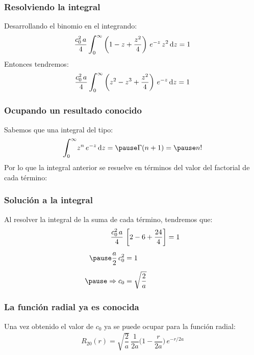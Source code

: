 \documentclass[12pt]{beamer}
\begin{document}
\begin{frame}
\frametitle{Resolviendo la integral}
Desarrollando el binomio en el integrando:
\pause
\begin{align*}
\dfrac{c_{0}^{2} \, a}{4} \, \scaleint{6ex}_{\bs 0}^{\infty} \left( 1 - z + \dfrac{z^{2}}{4} \right) \, e^{-z} \, z^{2} \dd{z} = 1
\end{align*}
\pause
Entonces tendremos:
\begin{align*}
\dfrac{c_{0}^{2} \, a}{4} \, \scaleint{6ex}_{\bs 0}^{\infty} \left( z^{2} - z^{3} + \dfrac{z^{2}}{4} \right) \, e^{-z} \dd{z} = 1
\end{align*}
\end{frame}
\begin{frame}
\frametitle{Ocupando un resultado conocido}
Sabemos que una integral del tipo:
\begin{eqnarray*}
\scaleint{6ex}_{\bs 0}^{\infty} z^{n} \, e^{-z} \dd{z} = \pause \Gamma(n + 1) = \pause n!
\end{eqnarray*}
\pause
Por lo que la integral anterior se resuelve en términos del valor del factorial de cada término:
\end{frame}
\begin{frame}
\frametitle{Solución a la integral}
Al resolver la integral de la suma de cada término, tendremos que:
\pause
\begin{equation*}
\begin{aligned}
\dfrac{c_{0}^{2} \, a}{4} \, &\left[ 2 - 6 + \dfrac{24}{4} \right] = 1 \\[0.5em] \pause
\dfrac{a}{2} \, c_{0}^{2} &= 1 \\[0.5em] \pause
\Rightarrow c_{0} &= \sqrt{\dfrac{2}{a}}
\end{aligned}
\end{equation*}
\end{frame}
\begin{frame}
\frametitle{La función radial ya es conocida}
Una vez obtenido el valor de $c_{0}$ ya se puede ocupar para la función radial:
\pause
\begin{align*}
R_{20} (r) = \sqrt{\dfrac{2}{a}} \, \dfrac{1}{2 a} \bigg( 1 - \dfrac{r}{2 a} \bigg) \, e^{-r/2a}
\end{align*}
\end{frame}
\end{document}
